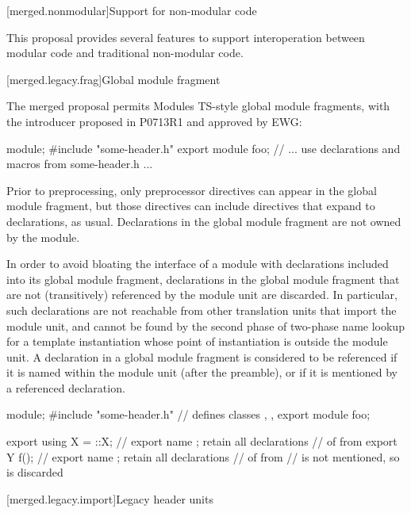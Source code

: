 [merged.nonmodular]{Support for non-modular code}

\pnum
This proposal provides several features to support
interoperation between modular code
and traditional non-modular code.

[merged.legacy.frag]{Global module fragment}

\pnum
The merged proposal permits Modules TS-style global module fragments,
with the  introducer proposed in P0713R1
and approved by EWG:

\begin{codeblock}
module;
#include "some-header.h"
export module foo;
// ... use declarations and macros from some-header.h ...
\end{codeblock}

\pnum
Prior to preprocessing, only preprocessor directives can appear
in the global module fragment, but those directives can include
 directives that expand to declarations, as usual.
Declarations in the global module fragment
are not owned by the module.

\pnum
In order to avoid bloating the interface of a module with declarations
included into its global module fragment, declarations in the global
module fragment that are not (transitively) referenced by the module unit are
discarded.
In particular, such declarations are not reachable from other translation
units that import the module unit, and cannot be found by the second phase
of two-phase name lookup for a template instantiation whose point of
instantiation is outside the module unit.
A declaration in a global module fragment is considered to be referenced if it
is named within the module unit (after the preamble), or if it is mentioned
by a referenced declaration.

\pnum
\begin{example}
\begin{codeblock}
module;
#include "some-header.h" // defines classes , , 
export module foo;

export using X = ::X; // export name ; retain all declarations
                      // of  from 
export Y f(); // export name ; retain all declarations
              // of  from 
//  is not mentioned, so is discarded
\end{codeblock}
\end{example}

[merged.legacy.import]{Legacy header units}

